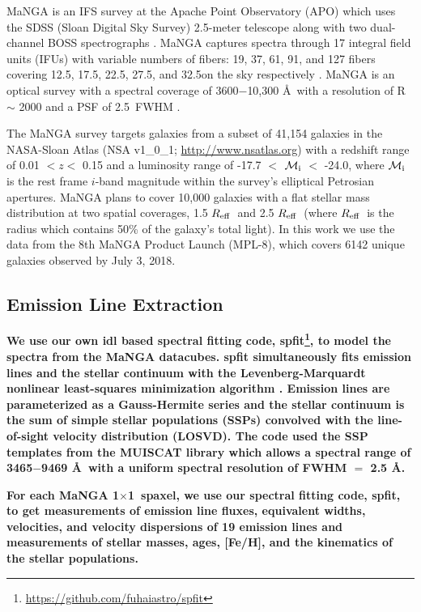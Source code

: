 \documentclass[iop,revtex4,twocolumn,apj,numberedappendix,appendixfloats]{emulateapj}
\newcommand{\reff}{$R_{\rm eff}$}
\begin{document}
MaNGA is an IFS survey at the Apache Point Observatory (APO) which uses the SDSS (Sloan Digital Sky Survey) 2.5-meter telescope along with two dual-channel BOSS spectrographs \citep{Drory:2015}. MaNGA captures spectra through 17 integral field units (IFUs) with variable numbers of fibers: 19, 37, 61, 91, and 127 fibers covering 12.5\arcsec, 17.5\arcsec, 22.5\arcsec, 27.5\arcsec, and 32.5\arcsec on the sky respectively \citep{Law:2015}. MaNGA is an optical survey with a spectral coverage of 3600$-$10,300 \AA\ with a resolution of R $\sim$ 2000 and a PSF of 2.5\arcsec\ FWHM \citep{Bundy:2015}. 

The MaNGA survey targets galaxies from a subset of 41,154 galaxies in the NASA-Sloan Atlas (NSA v1\_0\_1; \url{http://www.nsatlas.org}) with a redshift range of 0.01 $< z <$ 0.15 and a luminosity range of -17.7 $<$ $\mathcal{M}_{\rm i}$ $<$ -24.0, where $\mathcal{M}_{\rm i}$ is the rest frame $i$-band magnitude within the survey's elliptical Petrosian apertures. MaNGA plans to cover 10,000 galaxies with a flat stellar mass distribution at two spatial coverages, 1.5 \reff\ and 2.5 \reff\ (where \reff\ is the radius which contains 50\% of the galaxy's total light). In this work we use the data from the 8th MaNGA Product Launch (MPL-8), which covers 6142 unique galaxies observed by July 3, 2018. 

\subsection{\textbf{Emission Line Extraction}}\label{sec:spfit}

\textbf{
We use our own {\sc idl} based spectral fitting code, {\sc spfit}\footnote{\url{https://github.com/fuhaiastro/spfit}}, to model the spectra from the MaNGA datacubes. {\sc spfit} simultaneously fits emission lines and the stellar continuum with the Levenberg-Marquardt nonlinear least-squares minimization algorithm . Emission lines are parameterized as a Gauss-Hermite series and the stellar continuum is the sum of simple stellar populations (SSPs) convolved with the line-of-sight velocity distribution (LOSVD). The code used the SSP templates from the MUISCAT library \citep{Vazdekis:2012} which allows a spectral range of 3465$-$9469 \AA\ with a uniform spectral resolution of FWHM $=$ 2.5 \AA.
}

\textbf{
For each MaNGA 1\arcsec$\times$1\arcsec\ spaxel, we use our spectral fitting code, {\sc spfit}, to get measurements of emission line fluxes, equivalent widths, velocities, and velocity dispersions of 19 emission lines and measurements of stellar masses, ages, [Fe/H], and the kinematics of the stellar populations.
}
\end{document}
